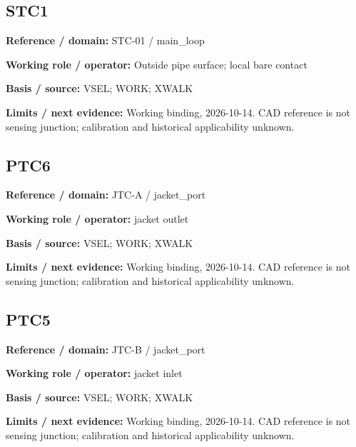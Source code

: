 \documentclass[11pt]{article}
\begin{document}
\par\noindent\begin{minipage}{\textwidth}\small\setlength{\parskip}{2pt}
\subsection*{STC1}
\textbf{Reference / domain:} STC-01 / main\_\allowbreak{}loop\par
\textbf{Working role / operator:} Outside pipe surface; local bare contact\par
\textbf{Basis / source:} VSEL; WORK; XWALK\par
\textbf{Limits / next evidence:} Working binding, 2026-10-14. CAD reference is not sensing junction; calibration and historical applicability unknown.\par
\end{minipage}\par\vspace{5pt}
\par\noindent\begin{minipage}{\textwidth}\small\setlength{\parskip}{2pt}
\subsection*{PTC6}
\textbf{Reference / domain:} JTC-A / jacket\_\allowbreak{}port\par
\textbf{Working role / operator:} jacket outlet\par
\textbf{Basis / source:} VSEL; WORK; XWALK\par
\textbf{Limits / next evidence:} Working binding, 2026-10-14. CAD reference is not sensing junction; calibration and historical applicability unknown.\par
\end{minipage}\par\vspace{5pt}
\par\noindent\begin{minipage}{\textwidth}\small\setlength{\parskip}{2pt}
\subsection*{PTC5}
\textbf{Reference / domain:} JTC-B / jacket\_\allowbreak{}port\par
\textbf{Working role / operator:} jacket inlet\par
\textbf{Basis / source:} VSEL; WORK; XWALK\par
\textbf{Limits / next evidence:} Working binding, 2026-10-14. CAD reference is not sensing junction; calibration and historical applicability unknown.\par
\end{minipage}\par\vspace{5pt}
\end{document}
